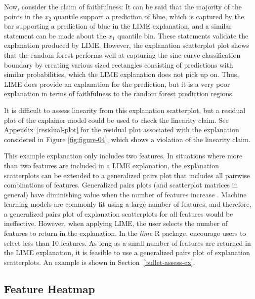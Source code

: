 \documentclass[AMS,STIX2COL]{WileyNJD-v2}\usepackage[]{graphicx}\usepackage[]{color}
\begin{document}
Now, consider the claim of faithfulness: It can be said that the majority of the points in the $x_2$ quantile support a prediction of blue, which is captured by the bar supporting a prediction of blue in the LIME explanation, and a similar statement can be made about the $x_1$ quantile bin. These statements validate the explanation produced by LIME. However, the explanation scatterplot plot shows that the random forest performs well at capturing the sine curve classification boundary by creating various sized rectangles consisting of predictions with similar probabilities, which the LIME explanation does not pick up on. Thus, LIME does provide an explanation for the prediction, but it is a very poor explanation in terms of faithfulness to the random forest prediction regions.

It is difficult to assess linearity from this explanation scatterplot, but a residual plot of the explainer model could be used to check the linearity claim. See Appendix~\ref{residual-plot} for the residual plot associated with the explanation considered in Figure \ref{fig:figure-04}, which shows a violation of the linearity claim.

This example explanation only includes two features. In situations where more than two features are included in a LIME explanation, the explanation scatterplots can be extended to a generalized pairs plot \citep{emerson:2013} that includes all pairwise combinations of features. Generalized pairs plots (and scatterplot matrices in general) have diminishing value when the number of features increase \citep{jensen:2011} \citep{sweller:2011}. Machine learning models are commonly fit using a large number of features, and therefore, a generalized pairs plot of explanation scatterplots for all features would be ineffective. However, when applying LIME, the user selects the number of features to return in the explanation. In the \emph{lime} R package, \citet{pedersen:2020} encourage users to select less than 10 features. As long as a small number of features are returned in the LIME explanation,  it is feasible to use a generalized pairs plot of explanation scatterplots. An example is shown in Section~\ref{bullet-assess-ex}.

\subsection{Feature Heatmap} \label{feat-heat}
\end{document}
